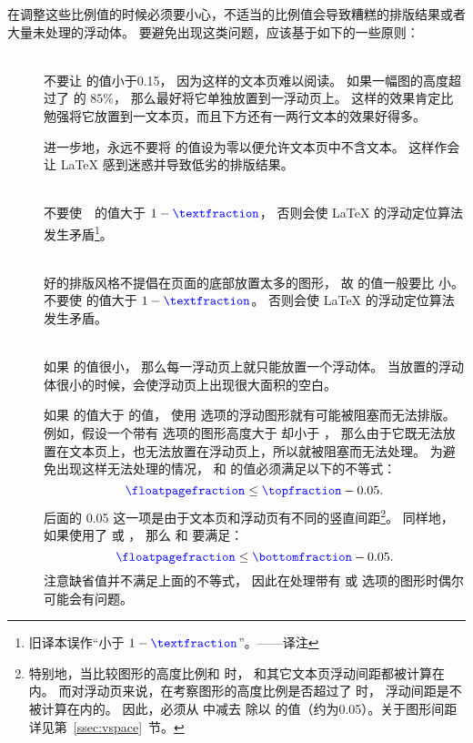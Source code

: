 在调整这些比例值的时候必须要小心，不适当的比例值会导致糟糕的排版结果或者大量未处理的浮动体。
要避免出现这类问题，应该基于如下的一些原则：
\begin{description}
	\item [] \mbox{} \\
	不要让  的值小于0.15，
	因为这样的文本页难以阅读。
	如果一幅图的高度超过了  的 $85\percent$，
	那么最好将它单独放置到一浮动页上。
	这样的效果肯定比勉强将它放置到一文本页，而且下方还有一两行文本的效果好得多。
	
	进一步地，永远不要将  的值设为零以便允许文本页中不含文本。
	这样作会让 \LaTeX{} 感到迷惑并导致低劣的排版结果。
	
	\item [] \mbox{} \\
	不要使~~的值大于 $1-\text{\cmd{textfraction}}$，
	否则会使 \LaTeX{} 的浮动定位算法发生矛盾\footnote{
		旧译本误作“小于 $1-\text{\cmd{textfraction}}$”。——译注}。
	
	\item [] \mbox{} \\
	好的排版风格不提倡在页面的底部放置太多的图形，
	故  的值一般要比  小。
	不要使  的值大于 $1-\text{\cmd{textfraction}}$。
	否则会使 \LaTeX{} 的浮动定位算法发生矛盾。
	
	\item [] \mbox{} \\
	如果  的值很小，
	那么每一浮动页上就只能放置一个浮动体。
	当放置的浮动体很小的时候，会使浮动页上出现很大面积的空白。
	
	如果  的值大于  的值，
	使用 \opt{[tp]} 选项的浮动图形就有可能被阻塞而无法排版。
	例如，假设一个带有 \opt{[tp]} 选项的图形高度大于  却小于 ，
	那么由于它既无法放置在文本页上，也无法放置在浮动页上，所以就被阻塞而无法处理。
	为避免出现这样无法处理的情况，
	 和  的值必须满足以下的不等式：
	\[
	\text{\cmd{floatpagefraction}} \leq \text{\cmd{topfraction}} - 0.05.
	\]
	后面的 0.05 这一项是由于文本页和浮动页有不同的竖直间距\footnote{
        特别地，当比较图形的高度比例和  时，
		 和其它文本页浮动间距都被计算在内。
		而对浮动页来说，在考察图形的高度比例是否超过了  时，
		浮动间距是不被计算在内的。
		因此，必须从  中减去  除以  的值（约为0.05）。关于图形间距详见第~\ref{ssec:vspace}~节。}。
	同样地，如果使用了 \opt{[bp]} 或 \opt{[hbp]}，
	那么  和  要满足：
	\[
	\text{\cmd{floatpagefraction}} \leq \text{\cmd{bottomfraction}} - 0.05.
	\]
	注意缺省值并不满足上面的不等式，
	因此在处理带有 \opt{[bp]} 或 \opt{[hbp]} 选项的图形时偶尔可能会有问题。
\end{description}

